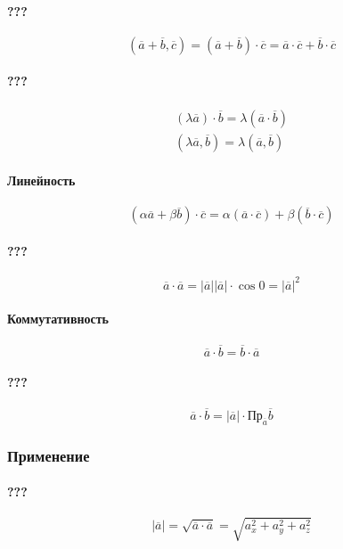 \documentclass{article}
\begin{document}
\paragraph{???}
\[
    (\overline{a} + \overline{b}, \overline{c}) = 
    (\overline{a} + \overline{b}) \cdot \overline{c} =
    \overline{a} \cdot \overline{c} + \overline{b} \cdot \overline{c}
\]

\paragraph{???}
\begin{gather*}
    (\lambda \overline{a}) \cdot \overline{b} = \lambda(\overline{a} \cdot \overline{b}) \\
    (\lambda \overline{a}, \overline{b}) = \lambda(\overline{a}, \overline{b})
\end{gather*}


\paragraph{Линейность}
\[
    (\alpha \overline{a} + \beta \overline{b}) \cdot \overline{c} =
    \alpha (\overline{a} \cdot \overline{c}) + \beta (\overline{b} \cdot \overline{c})
\]

\paragraph{???}
\[
    \overline{a} \cdot \overline{a} = |\overline{a}||\overline{a}| \cdot \cos 0 = |\overline{a}|^2
\]

\paragraph{Коммутативность}
\[
    \overline{a} \cdot \overline{b} = \overline{b} \cdot \overline{a}
\]

\paragraph{???}
\[
    \overline{a} \cdot \overline{b} = |\overline{a}| \cdot \text{Пр}_{\overline{a}} \overline{b}
\]


\subsubsection{Применение}

\paragraph{???}
\[
    |\overline{a}| = \sqrt{\overline{a} \cdot \overline{a}} = \sqrt{a_x^2 + a_y^2 + a_z^2}
\]
\end{document}
